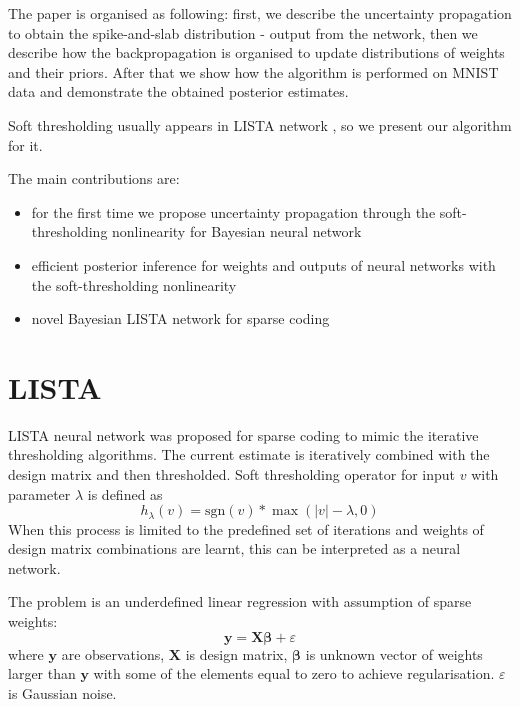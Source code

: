 \documentclass[letterpaper]{article}
\begin{document}
The paper is organised as following: first, we describe the uncertainty propagation to obtain the spike-and-slab distribution - output from the network, then we describe how the backpropagation is organised to update distributions of weights and their priors. After that we show how the algorithm is performed on MNIST data and demonstrate the obtained posterior estimates.

Soft thresholding usually appears in LISTA network \cite{gregor2010learning}, so we present our algorithm for it.

The main contributions are: 
\begin{itemize}
\item for the first time we propose uncertainty propagation through the soft-thresholding nonlinearity for Bayesian neural network
\item efficient posterior inference for weights and outputs of neural networks with the soft-thresholding nonlinearity
\item novel Bayesian LISTA network for sparse coding
\end{itemize}

\section{LISTA}

LISTA neural network was proposed for sparse coding to mimic the iterative thresholding algorithms. The current estimate is iteratively combined with the design matrix and then thresholded. Soft thresholding operator for input $v$ with parameter $\lambda$ is defined as
\begin{equation}
h_\lambda(v) = \text{sgn}(v) * \max(|v| - \lambda, 0)
\end{equation} 
When this process is limited to the predefined set of iterations and weights of design matrix combinations are learnt, this can be interpreted as a neural network.

The problem is an underdefined linear regression with assumption of sparse weights:
\begin{equation}
\label{eq:regression_problem}
\mathbf{y} = \mathbf{X}\boldsymbol\beta + \varepsilon
\end{equation}
where $\mathbf{y}$ are observations, $\mathbf{X}$ is design matrix, $\boldsymbol\beta$ is unknown vector of weights larger than $\mathbf{y}$ with some of the elements equal to zero to achieve regularisation. $\varepsilon$ is Gaussian noise.
\end{document}
